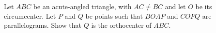 Let $ABC$ be an acute-angled triangle, with $AC \neq BC$ and let $O$ be its circumcenter. Let $P$ and $Q$ be points such that $BOAP$ and $COPQ$ are parallelograms. Show that $Q$ is the orthocenter of $ABC$.